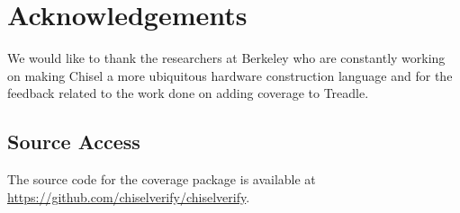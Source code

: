\documentclass[conference]{IEEEtran}
\newcommand{\todo}[1]{{\color{olive} TODO: #1}}
\newcommand{\martin}[1]{{\color{blue} Martin: #1}}
\newcommand{\hjd}[1]{{\color{pink} Hans: #1}}
\begin{document}
\section*{Acknowledgements}
We would like to thank the researchers at Berkeley who are constantly working on making Chisel a more ubiquitous hardware construction language and for the feedback related to the work done on adding coverage to Treadle.

\subsection*{Source Access}
The source code for the coverage package is available at\\ \url{https://github.com/chiselverify/chiselverify}.



\end{document}
